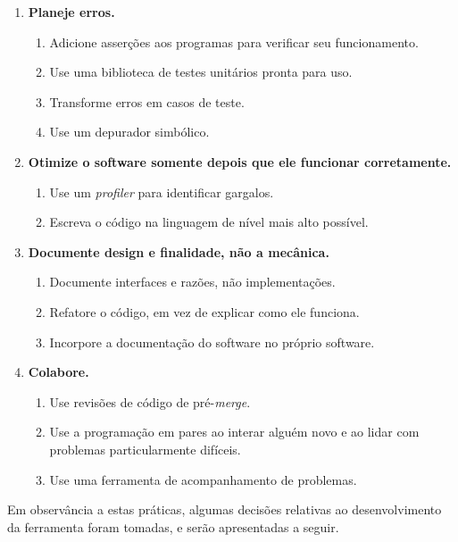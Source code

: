 \begin{tcolorbox}
\begin{enumerate}
\item \textbf{Planeje erros.}
    \begin{enumerate}
        \item Adicione asserções aos programas para verificar seu funcionamento.
        \item Use uma biblioteca de testes unitários pronta para uso.
        \item Transforme erros em casos de teste.
        \item Use um depurador simbólico.
    \end{enumerate}

\item \textbf{Otimize o software somente depois que ele funcionar corretamente.}
    \begin{enumerate}
        \item Use um \textit{profiler} para identificar gargalos.
        \item Escreva o código na linguagem de nível mais alto possível.
    \end{enumerate}

\item \textbf{Documente design e finalidade, não a mecânica.}
    \begin{enumerate}
        \item Documente interfaces e razões, não implementações.
        \item Refatore o código, em vez de explicar como ele funciona.
        \item Incorpore a documentação do software no próprio software.
    \end{enumerate}

\item \textbf{Colabore.}
    \begin{enumerate}
        \item Use revisões de código de pré-\textit{merge}.
        \item Use a programação em pares ao interar alguém novo e ao lidar com problemas particularmente difíceis.
        \item Use uma ferramenta de acompanhamento de problemas.
    \end{enumerate}
\end{enumerate}
\end{tcolorbox}

Em observância a estas práticas, algumas decisões relativas ao desenvolvimento da ferramenta foram tomadas, e serão apresentadas a seguir.

